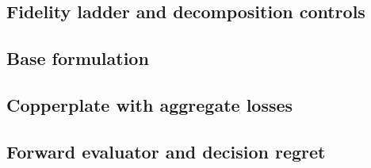\documentclass[a4paper,fleqn]{cas-dc}
\begin{document}
\subsection{Fidelity ladder and decomposition controls}

\subsection{Base formulation}

\subsection{Copperplate with aggregate losses}

\subsection{Forward evaluator and decision regret}
\end{document}
